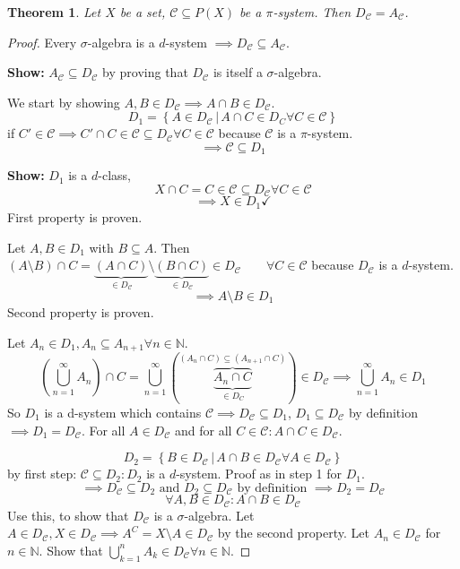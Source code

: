 \documentclass{article}
\newtheorem{theorem}{Theorem}  \numberwithin{theorem}{section}
\newcommand{\setdef}[2]{\left\{\left.#1\,\right|\,#2\right\}}
\begin{document}
\begin{theorem} %
  \label{thm:one}
  Let $X$ be a set, $\mathcal C \subseteq P(X)$ be a $\pi$-system. Then $D_{\mathcal C} = A_{\mathcal C}$.
\end{theorem}
\begin{proof}
  Every $\sigma$-algebra is a $d$-system $\implies D_{\mathcal C} \subseteq A_{\mathcal C}$.

  \textbf{Show:} $A_{\mathcal C} \subseteq D_{\mathcal C}$ by proving that $D_{\mathcal C}$ is itself a $\sigma$-algebra.

  We start by showing $A,B \in D_{\mathcal C} \implies A \cap B \in D_{\mathcal C}$.
  \[ D_1 = \setdef{A \in D_{\mathcal C}}{A \cap C \in D_C \forall C \in \mathcal C} \]
  if $C' \in \mathcal C \implies C' \cap C \in \mathcal C \subseteq D_{\mathcal C} \forall C \in \mathcal C$ because $\mathcal C$ is a $\pi$-system.
  \[ \implies \mathcal C \subseteq D_1 \]

  \textbf{Show:} $D_1$ is a $d$-class,
  \[ X \cap C = C \in \mathcal C \subseteq D_{\mathcal C} \forall C \in \mathcal C \]
  \[ \implies X \in D_1 \checkmark \]
  First property is proven.

  Let $A,B \in D_1$ with $B \subseteq A$. Then $(A \setminus B) \cap C = \underbrace{(A \cap C)}_{\in D_{\mathcal C}} \setminus \underbrace{(B \cap C)}_{\in D_{\mathcal C}} \in D_{\mathcal C} \qquad \forall C \in \mathcal C$
  because $D_{\mathcal C}$ is a $d$-system.
  \[ \implies A \setminus B \in D_1 \]
  Second property is proven.

  Let $A_n \in D_1, A_n \subseteq A_{n+1} \forall n \in \mathbb N$.
  \[ (\bigcup_{n=1}^\infty A_n) \cap C = \bigcup_{n=1}^\infty \left(\overbrace{\underbrace{A_n \cap C}_{\in D_C}}^{(A_n \cap C) \subseteq (A_{n+1} \cap C)}\right) \in D_{\mathcal C} \implies \bigcup_{n=1}^\infty A_n \in D_1 \]
  So $D_1$ is a d-system which contains $\mathcal C \implies D_{\mathcal C} \subseteq D_1$, $D_1 \subseteq D_{\mathcal C}$ by definition $\implies D_1 = D_{\mathcal C}$.
  For all $A \in D_{\mathcal C}$ and for all $C \in \mathcal C: A \cap C \in D_{\mathcal C}$.

  \[ D_2 = \setdef{B \in D_{\mathcal C}}{A \cap B \in D_{\mathcal C} \forall A \in D_{\mathcal C}} \]
  by first step: $\mathcal C \subseteq D_2: D_2$ is a $d$-system. Proof as in step 1 for $D_1$.
  \[ \implies D_{\mathcal C} \subseteq D_2 \text{ and } D_2 \subseteq D_{\mathcal C} \text{ by definition } \implies D_2 = D_{\mathcal C} \]
  \[ \forall A, B \in D_{\mathcal C}: A \cap B \in D_{\mathcal C} \]
  Use this, to show that $D_{\mathcal C}$ is a $\sigma$-algebra.
  Let $A \in D_{\mathcal C}, X \in D_{\mathcal C} \implies A^C = X \setminus A \in D_{\mathcal C}$ by the second property.
  Let $A_n \in D_{\mathcal C}$ for $n \in \mathbb N$. Show that $\bigcup_{k=1}^n A_k \in D_{\mathcal C} \forall n \in \mathbb N$.


\end{proof}
\end{document}
